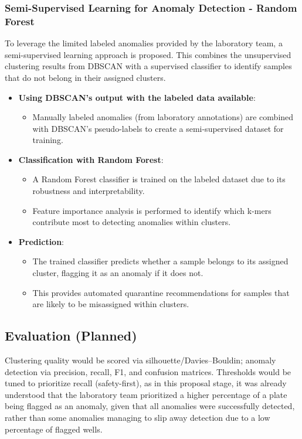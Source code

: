 \subsubsection{Semi-Supervised Learning for Anomaly Detection - Random Forest}
To leverage the limited labeled anomalies provided by the laboratory team, a semi-supervised learning approach is proposed. This combines the unsupervised clustering results from DBSCAN with a supervised classifier to identify samples that do not belong in their assigned clusters.

\begin{itemize}
    \item \textbf{Using DBSCAN's output with the labeled data available}:
    \begin{itemize}
        \item Manually labeled anomalies (from laboratory annotations) are combined with DBSCAN’s pseudo-labels to create a semi-supervised dataset for training.
    \end{itemize}

    \item \textbf{Classification with Random Forest}:
    \begin{itemize}
        \item A Random Forest classifier is trained on the labeled dataset due to its robustness and interpretability.
        \item Feature importance analysis is performed to identify which k-mers contribute most to detecting anomalies within clusters.
    \end{itemize}

    \item \textbf{Prediction}:
    \begin{itemize}
        \item The trained classifier predicts whether a sample belongs to its assigned cluster, flagging it as an anomaly if it does not.
        \item This provides automated quarantine recommendations for samples that are likely to be misassigned within clusters.
    \end{itemize}
\end{itemize}

\subsection{Evaluation (Planned)}
Clustering quality would be scored via silhouette/Davies–Bouldin; anomaly detection via precision, recall, F1, and confusion matrices. Thresholds would be tuned to prioritize recall (safety-first), as in this proposal stage, it was already understood that the laboratory team prioritized a higher percentage of a plate being flagged as an anomaly, given that all anomalies were successfully detected, rather than some anomalies managing to slip away detection due to a low percentage of flagged wells.

